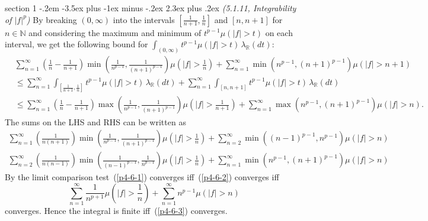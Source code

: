 \documentclass[12pt]{article}
\makeatletter
\theoremstyle{norm}
\newcommand{\N}[0]{\mathbb{N}}
\newcommand{\R}[0]{\mathbb{R}}
\newcommand{\rc}[1]{\frac{1}{#1}}
\newcommand{\la}[0]{\lambda}
\newcommand{\pa}[1]{\left( {#1} \right)}
\newcommand{\iy}[0]{\infty}
\newenvironment{problem}{\@startsection
       {section}
       {1}
       {-.2em}
       {-3.5ex plus -1ex minus -.2ex}
       {2.3ex plus .2ex}
       {\pagebreak[3]%
       \large\bf\noindent{Problem }
       }
       }
       {%
       }
\makeatother
\begin{document}
\begin{problem}{\it (5.1.11, Integrability of $|f|^p$)}
By breaking $(0,\infty)$ into the intervals $[\rc{n+1},\rc{n}]$ and $[n,n+1]$ for $n\in \N$ and considering the maximum and minimum of $t^{p-1}\mu(|f|>t)$ on each interval, we get the following bound for $\int_{(0,\iy)}t^{p-1} \mu(|f|>t)\,\la_{\R}(dt)$:
\begin{align*}
& \sum_{n=1}^{\iy}\pa{\rc n-\rc{n+1}}\min\pa{\rc{n^{p-1}},\rc{(n+1)^{p-1}}}\mu(|f|>\rc{n})
+\sum_{n=1}^{\iy} \min(n^{p-1},(n+1)^{p-1})\mu(|f|>n+1)\\
&\leq \sum_{n=1}^{\iy}\int_{[\rc{n+1},\rc{n}]}t^{p-1} \mu(|f|>t)\,\la_{\R}(dt)+\sum_{n=1}^{\iy}\int_{[n,n+1]}t^{p-1} \mu(|f|>t)\,\la_{\R}(dt)\\
&\le \sum_{n=1}^{\iy}\pa{\rc n-\rc{n+1}}\max\pa{\rc{n^{p-1}},\rc{(n+1)^{p-1}}}\mu(|f|>\rc{n+1})
+\sum_{n=1}^{\iy} \max(n^{p-1},(n+1)^{p-1})\mu(|f|>n).
\end{align*}
The sums on the LHS and RHS can be written as
\begin{gather}
\sum_{n=1}^{\iy}\pa{\rc{n(n+1)}}\min\pa{\rc{n^{p-1}},\rc{(n+1)^{p-1}}}\mu(|f|>\rc{n})
+\sum_{n=2}^{\iy} \min((n-1)^{p-1},n^{p-1})\mu(|f|>n)
\label{p4-6-1}\\
\sum_{n=2}^{\iy}\pa{\rc{n(n-1)}}\min\pa{\rc{(n-1)^{p-1}},\rc{n^{p-1}}}\mu(|f|>\rc{n})
+\sum_{n=1}^{\iy} \min(n^{p-1},(n+1)^{p-1})\mu(|f|>n)
\label{p4-6-2}
\end{gather}
By the limit comparison test~(\ref{p4-6-1}) converges iff~(\ref{p4-6-2}) converges iff
\begin{equation}\label{p4-6-3}
\sum_{n=1}^{\iy} \rc{n^{p+1}} \mu\pa{|f|>\rc{n}} +\sum_{n=1}^{\iy} n^{p-1}\mu(|f|>n)
\end{equation}
converges. Hence the integral is finite iff~(\ref{p4-6-3}) converges.
\end{problem}
\end{document}
